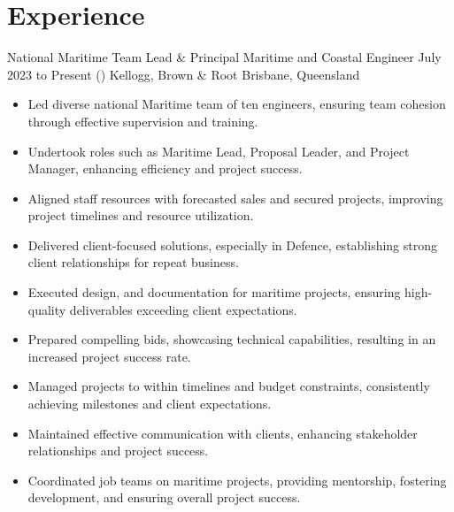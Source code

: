 
\section{Experience}


	\entrytable%
	{National Maritime Team Lead \& Principal Maritime and Coastal Engineer}
	{July 2023 to Present}
	{()}
	{Kellogg, Brown \& Root}
	{Brisbane, Queensland}
	{\begin{itemize}
		\item Led diverse national Maritime team of ten engineers, ensuring team cohesion through effective supervision and training.
		\item Undertook roles such as Maritime Lead, Proposal Leader, and Project Manager, enhancing efficiency and project success.
		\item Aligned staff resources with forecasted sales and secured projects, improving project timelines and resource utilization.
		\item Delivered client-focused solutions, especially in Defence, establishing strong client relationships for repeat business.
		\item Executed design, and documentation for maritime projects, ensuring high-quality deliverables exceeding client expectations.
		\item Prepared compelling bids, showcasing technical capabilities, resulting in an increased project success rate.
		\item Managed projects to within timelines and budget constraints, consistently achieving milestones and client expectations.
		\item Maintained effective communication with clients, enhancing stakeholder relationships and project success.
		\item Coordinated job teams on maritime projects, providing mentorship, fostering development, and ensuring overall project success.
		\end{itemize}
	}

